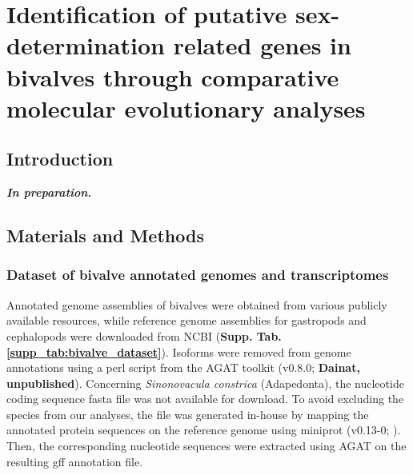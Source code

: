 \documentclass[../main.tex]{subfiles}
\begin{document}
{
\chapter{Identification of putative sex-determination related genes in bivalves through comparative molecular evolutionary analyses}
\label{molecularEvolution}


\vspace{5mm}




\vspace{5mm}

}

\newpage

\section{Introduction} \label{chapter3_introduction}

\textbf{\textit{In preparation.}}

\section{Materials and Methods} \label{chpater3_MM}
\subsection{Dataset of bivalve annotated genomes and transcriptomes}
Annotated genome assemblies of bivalves were obtained from various publicly available resources, while reference genome assemblies for gastropods and cephalopods were downloaded from NCBI (\textbf{Supp. Tab. \ref{supp_tab:bivalve_dataset}}). Isoforms were removed from genome annotations using a perl script from the AGAT toolkit (v0.8.0; \textbf{Dainat, unpublished}). Concerning \textit{Sinonovacula constrica} (Adapedonta), the nucleotide coding sequence fasta file was not available for download. To avoid excluding the species from our analyses, the file was generated in-house by mapping the annotated protein sequences on the reference genome using miniprot (v0.13-0; \textbf{\cite{li2023miniprot}}). Then, the corresponding nucleotide sequences were extracted using AGAT on the resulting gff annotation file.
\end{document}
